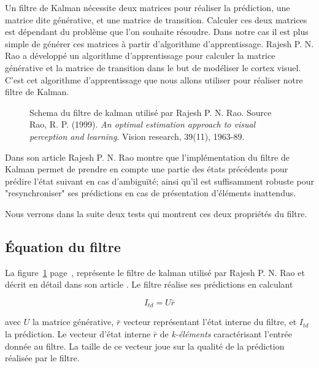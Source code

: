 Un filtre de Kalman nécessite deux matrices pour réaliser la prédiction, une
matrice dite générative, et une matrice de transition\cite{Rao1999}. Calculer
ces deux matrices est dépendant du problème que l'on souhaite résoudre. Dans
notre cas il est plus simple de générer ces matrices à partir d'algorithme
d'apprentissage. Rajesh P. N. Rao a développé un algorithme d'apprentissage
pour calculer la matrice générative et la matrice de transition dans le but de
modéliser le cortex visuel\cite{Rao1999}. C'est cet algorithme d'apprentissage
que nous allons utiliser pour réaliser notre filtre de Kalman.

\begin{figure}[ht]
   \begin{center}
   \end{center}
   \caption[Schema du filtre de kalman]{Schema du filtre de kalman utilisé par
   Rajesh P. N. Rao. Source Rao, R. P. (1999). \textit{An optimal estimation
   approach to visual perception and learning}. Vision research, 39(11),
   1963-89. \cite{Rao1999}}
   \label{fig:filtre_kalman}
\end{figure}

Dans son article\cite{Rao1999} Rajesh P. N. Rao montre que l'implémentation du
filtre de Kalman permet de prendre en compte une partie des états précédents
pour prédire l'état suivant en cas d'ambiguïté; ainsi qu'il est suffisamment
robuste pour "resynchroniser" ses prédictions en cas de présentation d'éléments
inattendus.

Nous verrons dans la suite deux tests qui montrent ces deux propriétés du filtre.

\subsection{Équation du filtre} %
\label{sub:Équation du filtre}

La figure~\ref{fig:filtre_kalman} page~\pageref{fig:filtre_kalman}, représente
le filtre de kalman utilisé par Rajesh P. N. Rao et décrit en détail dans son
article \cite{Rao1999}. Le filtre réalise ses prédictions en calculant

\[ I_{td} = U\bar{r} \]

avec $U$ la matrice générative, $\bar{r}$ vecteur représentant l'état interne
du filtre, et $I_{td}$ la prédiction. Le vecteur d'état interne $\bar{r}$ de
\textit{k-éléments} caractérisant l'entrée donnée au filtre. La taille de ce
vecteur joue sur la qualité de la prédiction réalisée par le filtre.


